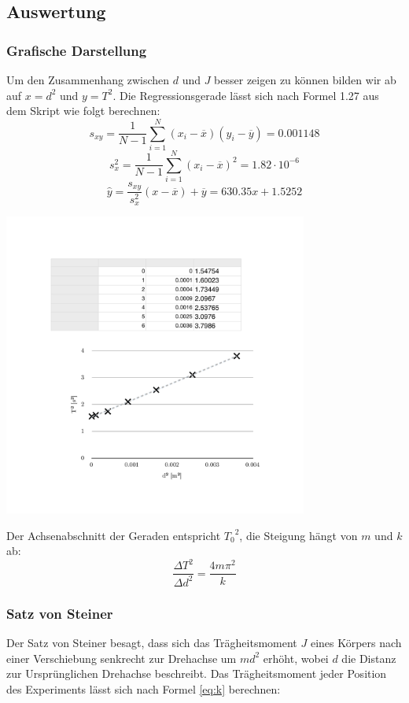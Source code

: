 \documentclass[12pt,a4paper]{article}
\begin{document}
\subsection*{Auswertung}
\subsubsection*{Grafische Darstellung}
Um den Zusammenhang zwischen $d$ und $J$ besser zeigen zu k\"onnen bilden wir ab auf $x = d^2$ und $y = T^2$.
Die Regressionsgerade l\"asst sich nach Formel 1.27 aus dem Skript wie folgt berechnen:
\[ s_{xy} = \frac{1}{N - 1}\sum_{i=1}^{N}(x_i - \overline{x})(y_i - \overline{y}) =  0.001148 \]
\[ s_x^2 = \frac{1}{N - 1}\sum_{i=1}^{N}(x_i - \overline{x})^2 =  1.82\cdot 10^{-6} \]
\[ \hat{y} = \frac{s_{xy}}{s_x^2}(x - \overline{x}) + \overline{y} = 630.35x + 1.5252 \]
\begin{center}
\includegraphics[width=10cm]{diagram.pdf}
\end{center}

\noindent
Der Achsenabschnitt der Geraden entspricht ${T_0}^2$, die Steigung h\"angt von $m$ und $k$ ab:
\[ \frac{\Delta T^2}{\Delta d^2} = \frac{4m\pi^2}{k} \]

\newpage
\subsubsection*{Satz von Steiner}
Der Satz von Steiner besagt, dass sich das Tr\"agheitsmoment $J$ eines K\"orpers nach einer Verschiebung senkrecht zur Drehachse um $md^2$ erh\"oht, wobei $d$ die Distanz zur Urspr\"unglichen Drehachse beschreibt. Das Tr\"agheitsmoment jeder Position des Experiments l\"asst sich nach Formel \ref{eq:k} berechnen:
\end{document}
